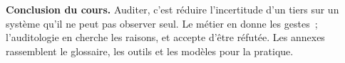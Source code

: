 \begin{boxinfo}
\textbf{Conclusion du cours.} Auditer, c'est réduire l'incertitude d'un
tiers sur un système qu'il ne peut pas observer seul. Le métier en donne
les gestes~; l'auditologie en cherche les raisons, et accepte d'être
réfutée. Les annexes rassemblent le glossaire, les outils et les modèles
pour la pratique.
\end{boxinfo}
